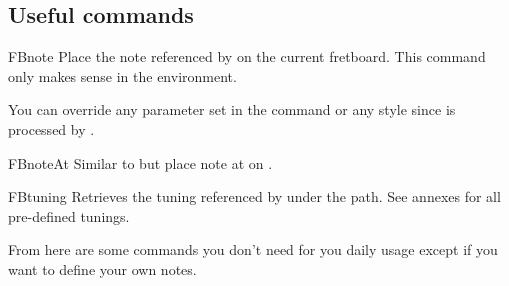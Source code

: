 \documentclass[a4paper]{article}
\begin{document}
\subsection{Useful commands}

\begin{docCommand}{FBnote}{}
  Place the note referenced by  on the current fretboard. This
  command only makes sense in the  environment.

  You can override any parameter set in the  command or
  any  style since  is processed by
  .
\end{docCommand}

\begin{docCommand}{FBnoteAt}{}
  Similar to  but place note  at 
  on .
\end{docCommand}


\begin{docCommand}{FBtuning}{}
  Retrieves the tuning referenced by  under the
   path. See annexes for all pre-defined tunings.
\end{docCommand}

From here are some commands you don't need for you daily usage except if you
want to define your own notes.
\end{document}

